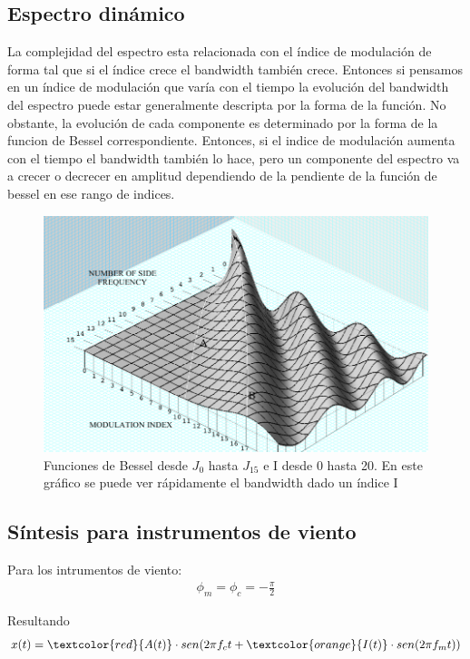 \documentclass[assd_tp2_main.tex]{subfiles}
\begin{document}
\subsection{Espectro dinámico}
La complejidad del espectro esta relacionada con el índice de modulación de forma tal que si el índice crece el bandwidth también crece. Entonces si pensamos en un índice de modulación que varía con el tiempo la evolución del bandwidth del espectro puede estar generalmente descripta por la forma de la función.
No obstante, la evolución de cada componente es determinado por la forma de la funcion de Bessel correspondiente.
Entonces, si el indice de modulación aumenta con el tiempo el bandwidth también lo hace, pero un componente del espectro va a crecer o decrecer en amplitud dependiendo de la pendiente de la función de bessel en ese rango de indices.

\begin{figure}[H]
\centering
\includegraphics[width=0.8\linewidth]{graficos/EJ4/EspectroDinamico.png}
\caption{Funciones de Bessel desde $J_0$ hasta $J_{15}$ e I desde 0 hasta 20. En este gráfico se puede ver rápidamente el bandwidth dado un índice I}
\label{fig:DynamicSpectrum}
\end{figure}



\subsection{Síntesis para instrumentos de viento}
Para los intrumentos de viento:
\begin{eqnarray*}
\displaystyle \phi_m=\phi_c=-\frac{\pi}{2}
\end{eqnarray*}
\par
Resultando
\begin{eqnarray*}
\textstyle x(t)=\textcolor{red}{A(t)}\cdot sen(2\pi f_c t+\textcolor{orange}{I(t)}\cdot sen(2\pi f_mt))
\end{eqnarray*}
\end{document}

